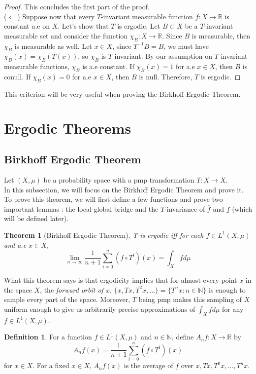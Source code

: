 \documentclass{article}
\newtheorem{theorem}{Theorem}[section]
\theoremstyle{definition}
\newtheorem{definition}{Definition}[section]
\begin{document}
\begin{proof}
    This concludes the first part of the proof.\\
    ($\Leftarrow$) Suppose now that every $T$-invariant measurable function $f:X\to\mathbb{R}$ is constant a.e on $X$. Let's show that $T$ is ergodic. Let $B\subset X$ be a $T$-invariant measurable set and consider the function $\chi_B:X\to\mathbb{R}$. Since $B$ is measurable, then $\chi_B$ is measurable as well. Let $x\in X$, since $T^{-1}B=B$, we must have $\chi_B(x)=\chi_B(T(x))$, so $\chi_B$ is $T$-invariant. By our assumption on $T$-invariant measurable functions, $\chi_B$ is a.e constant. If $\chi_B(x)=1$ for a.e $x\in X$, then $B$ is conull. If $\chi_B(x)=0$ for a.e $x\in X$, then $B$ is null. Therefore, $T$ is ergodic.
\end{proof}

This criterion will be very useful when proving the Birkhoff Ergodic Theorem.


\section{Ergodic Theorems}
\subsection{Birkhoff Ergodic Theorem}

Let $(X,\mu)$ be a probability space with a pmp transformation $T:X\rightarrow X$.\\
In this subsection, we will focus on the Birkhoff Ergodic Theorem and prove it. To prove this theorem, we will first define a few functions and prove two important lemmas : the local-global bridge and the $T$-invariance of $\overline{f}$ and $\underline{f}$ (which will be defined later).

\begin{theorem}[Birkhoff Ergodic Theorem]\label{Birkhoff}
    T is ergodic iff for each $f \in L^1(X,\mu)$ and a.e $x\in X$,
    $$\lim_{n\to\infty}\frac{1}{n+1}\sum_{i=0}^n(f\circ T^i)(x)=\int_Xfd\mu$$
\end{theorem}

What this theorem says is that ergodicity implies that for almost every point $x$ in the space $X$, the \textit{forward orbit of $x$}, $\{x, Tx, T^2x, ...\} = \{T^nx : n\in\mathbb{N}\}$ is enough to sample every part of the space. Moreover, $T$ being pmp makes this sampling of $X$ uniform enough to give us arbitrarily precise approximations of $\int_Xfd\mu$ for any $f\in L^1(X,\mu)$.

\begin{definition}
    For a function $f\in L^1(X,\mu)$ and $n\in \mathbb{N}$, define $A_nf:X\to \mathbb{R}$ by
    $$A_nf(x) = \frac{1}{n+1}\sum_{i=0}^n(f\circ T^i)(x)$$
    for $x\in X$. For a fixed $x\in X$, $A_nf(x)$ is the average of $f$ over $x, Tx, T^2x, ...,T^nx$.
\end{definition}
\end{document}
